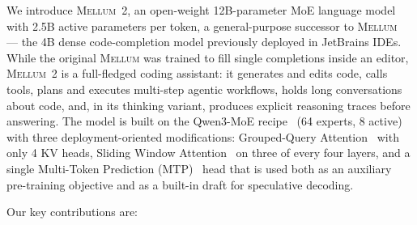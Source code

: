 \documentclass[11pt,a4paper]{article}
\newcommand{\modelname}{\textsc{Mellum~2}\xspace}
\newcommand{\prevmodelname}{\textsc{Mellum}\xspace}
\begin{document}
We introduce \modelname, an open-weight 12B-parameter MoE language model
with 2.5B active parameters per token, a general-purpose successor to
\prevmodelname~\cite{mellum2025} --- the 4B dense code-completion model previously
deployed in JetBrains IDEs. While the original \prevmodelname was trained to fill
single completions inside an editor, \modelname is a full-fledged coding
assistant: it generates and edits code, calls tools, plans and executes
multi-step agentic workflows, holds long conversations about code, and, in
its thinking variant, produces explicit reasoning traces before answering.
The model is built on the Qwen3-MoE recipe~\cite{yang2025qwen3} (64 experts,
8 active) with three deployment-oriented modifications: Grouped-Query
Attention~\cite{ainslie2023gqa} with only 4 KV heads, Sliding Window
Attention~\cite{beltagy2020longformer} on three of every four layers, and a
single Multi-Token Prediction (MTP)~\cite{gloeckle2024mtp} head that is used both as an auxiliary pre-training objective and as a built-in draft for speculative decoding.

Our key contributions are:
\end{document}
